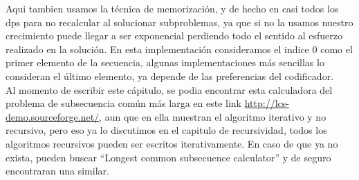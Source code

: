 Aqui tambien usamos la técnica de memorización, y de hecho en casi todos los dps para no recalcular al solucionar subproblemas, ya que si no la usamos nuestro crecimiento puede llegar a ser exponencial perdiendo todo el sentido al esfuerzo realizado en la solución. En esta implementación consideramos el indice $0$ como el primer elemento de la secuencia, algunas implementaciones más sencillas lo consideran el último elemento, ya depende de las preferencias del codificador.
\\Al momento de escribir este cápitulo, se podia encontrar esta calculadora del problema de subsecuencia común más larga en este link \url{http://lcs-demo.sourceforge.net/}, aun que en ella muestran el algoritmo iterativo y no recursivo, pero eso ya lo discutimos en el capitulo de recursividad, todos los algoritmos recursivos pueden ser escritos iterativamente. En caso de que ya no exista, pueden buscar ``Longest common subsecuence calculator'' y de seguro encontraran una similar.
